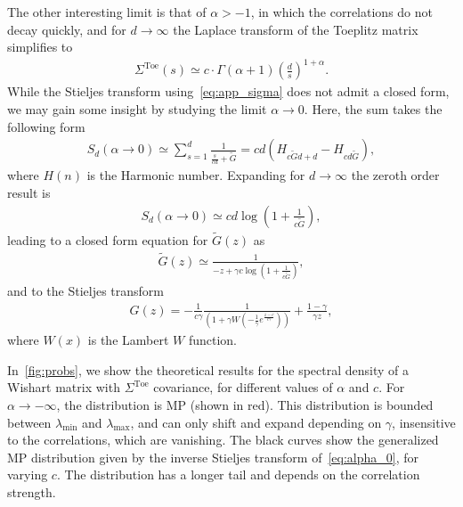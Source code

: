\documentclass{article}
\begin{document}
The other interesting limit is that of $\alpha > -1$, in which the correlations do not decay quickly, and for $d\to \infty$ the Laplace transform of the Toeplitz matrix simplifies to
\begin{align}
\label{eq:app_sigma}
{\Sigma}^\mathrm{Toe}(s)
\simeq 
c \cdot
\Gamma (\alpha +1) \left(\frac{d}{ s}\right)^{1+\alpha}.
\end{align}
While the Stieljes transform using~\cref{eq:app_sigma} does not admit a closed form, we may gain some insight by studying the limit $\alpha \to 0$. Here, the sum takes the following form
\begin{align}
    S_d(\alpha \to0)
    \simeq
    \sum_{s=1}^d
    \frac{1}{\frac{s}{c d}+\tilde{G}}
    =
c d \left(H_{c \tilde{G} d+d}-H_{c d \tilde{G}}\right),
\end{align}
where $H(n)$ is the Harmonic number. Expanding for $d\to \infty$ the zeroth order result is
\begin{align}
  S_d(\alpha \to0)\simeq  c d \log \left(1+\frac{1}{c \tilde{G}}\right),
\end{align}
leading to a closed form equation for $\tilde{G}(z)$ as
\begin{align}
    \tilde{G}(z)
    \simeq
    \frac{1}{-z+\gamma c  \log \left(1+\frac{1}{c \tilde{G}}\right)}
,
\end{align}
and to the Stieljes transform
\begin{align}
\label{eq:alpha_0}
   G(z)=
   -\frac{1}{c \gamma}
    \frac{1}
    {
    \left(1+\gamma  W\left(-\frac{1}{\gamma }e^{\frac{z-c}{c \gamma }}\right)\right)
    }
    +
    \frac{1-\gamma}{\gamma z},
\end{align}
where $W(x)$ is the Lambert $W$ function.

In~\cref{fig:probs}, we show the theoretical results for the spectral density of a Wishart matrix with $\Sigma^\mathrm{Toe}$ covariance, for different values of $\alpha$ and $c$. For $\alpha \to -\infty$, the distribution is MP (shown in red). This distribution is bounded between $\lambda_\mathrm{min}$ and $\lambda_\mathrm{max}$, and can only shift and expand depending on $\gamma$, insensitive to the correlations, which are vanishing. The black curves show the generalized MP distribution given by the inverse Stieljes transform of~\cref{eq:alpha_0}, for varying $c$. The distribution has a longer tail and depends on the correlation strength.
\end{document}
